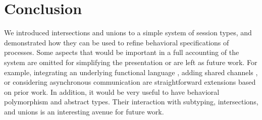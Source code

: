 
\chapter{Conclusion}

We introduced intersections and unions to a simple system of session types, and demonstrated how they can be used to refine behavioral specifications of processes. Some aspects that would be important in a full accounting of the system are omitted for simplifying the presentation or are left as future work. For example, integrating an underlying functional language \cite{ToninhoCP13}, adding shared channels \cite{CairesP10,PfenningG15}, or considering asynchronous communication \cite{DeYoungCPT12,PfenningG15,Griffith16phd} are straightforward extensions based on prior work. In addition, it would be very useful to have behavioral polymorphism \cite{CairesPPT13} and abstract types. Their interaction with subtyping, intersections, and unions is an interesting avenue for future work.
